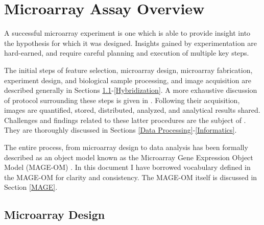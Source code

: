 
\section{Microarray Assay Overview}
A successful microarray experiment is one which is able to provide insight into
the hypothesis for which it was designed.  Insights gained by experimentation
are hard-earned, and require careful planning and execution of multiple key
steps.

The initial steps of feature selection, microarray design, microarray
fabrication, experiment design, and biological sample processing, and image
acquisition are described generally in Sections
\ref{ArrayDesign}-\ref{Hybridization}.  A more exhaustive discussion of
protocol surrounding these steps is given in \cite{wit2004}.  Following their
acquisition, images are quantified, stored, distributed, analyzed, and
analytical results shared.  Challenges and findings related to these latter
procedures are the subject of \emph{\dbthesis}.  They are thoroughly discussed
in Sections \ref{Data Processing}-\ref{Informatics}.

The entire process, from microarray design to data analysis has been formally
described as an object model known as the Microarray Gene Expression Object
Model (MAGE-OM) \cite{mage}.  In this document I have borrowed vocabulary
defined in the MAGE-OM for clarity and consistency.  The MAGE-OM itself is
discussed in Section \ref{MAGE}.

\subsection{Microarray Design}
\label{ArrayDesign}

